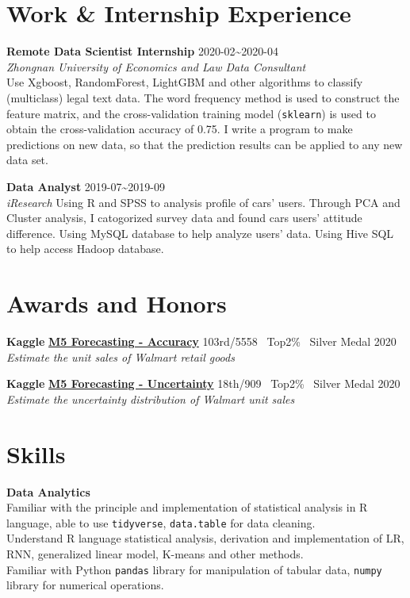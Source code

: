 \documentclass[11pt,]{article}
\begin{document}
\hypertarget{work-internship-experience}{%
\section{Work \& Internship
Experience}\label{work-internship-experience}}

\textbf{Remote Data Scientist Internship}
\hfill 2020-02\textasciitilde2020-04\\
\emph{Zhongnan University of Economics and Law Data Consultant}\\
Use Xgboost, RandomForest, LightGBM and other algorithms to classify
(multiclass) legal text data. The word frequency method is used to
construct the feature matrix, and the cross-validation training model
(\texttt{sklearn}) is used to obtain the cross-validation accuracy of
0.75. I write a program to make predictions on new data, so that the
prediction results can be applied to any new data set.

\textbf{Data Analyst} \hfill 2019-07\textasciitilde2019-09\\
\emph{iResearch} Using R and SPSS to analysis profile of cars' users.
Through PCA and Cluster analysis, I catogorized survey data and found
cars users' attitude difference. Using MySQL database to help analyze
users' data. Using Hive SQL to help access Hadoop database.

\hypertarget{awards-and-honors}{%
\section{Awards and Honors}\label{awards-and-honors}}

\textbf{Kaggle}
\href{https://www.kaggle.com/c/m5-forecasting-accuracy}{\textbf{M5
Forecasting - Accuracy}} \qquad 103rd/5558 ~Top2\% ~Silver Medal
\hfill 2020\\
\emph{Estimate the unit sales of Walmart retail goods}

\textbf{Kaggle}
\href{https://www.kaggle.com/c/m5-forecasting-uncertainty}{\textbf{M5
Forecasting - Uncertainty}} \qquad 18th/909 ~Top2\% ~Silver Medal
\hfill 2020\\
\emph{Estimate the uncertainty distribution of Walmart unit sales}

\hypertarget{skills}{%
\section{Skills}\label{skills}}

\textbf{Data Analytics}\\
Familiar with the principle and implementation of statistical analysis
in R language, able to use \texttt{tidyverse}, \texttt{data.table} for
data cleaning.\\
Understand R language statistical analysis, derivation and
implementation of LR, RNN, generalized linear model, K-means and other
methods.\\
Familiar with Python \texttt{pandas} library for manipulation of tabular
data, \texttt{numpy} library for numerical operations.
\end{document}
